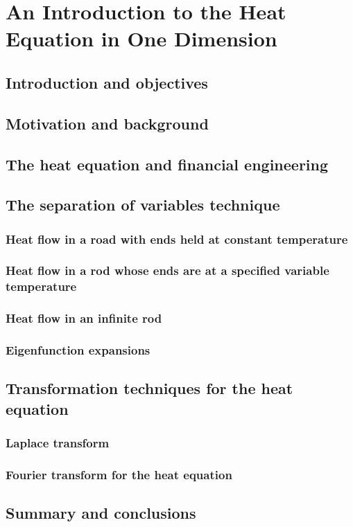 \chapter{An Introduction to the Heat Equation in One Dimension}

\section{Introduction and objectives}

\section{Motivation and background}

\section{The heat equation and financial engineering}

\section{The separation of variables technique}

\subsection{Heat flow in a road with ends held at constant temperature}

\subsection{Heat flow in a rod whose ends are at a specified variable temperature}

\subsection{Heat flow in an infinite rod}

\subsection{Eigenfunction expansions}

\section{Transformation techniques for the heat equation}

\subsection{Laplace transform}

\subsection{Fourier transform for the heat equation}

\section{Summary and conclusions}